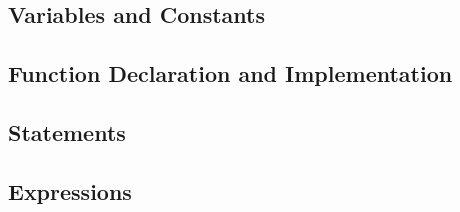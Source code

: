 \subsection{Variables and Constants}

\subsection{Function Declaration and Implementation}

\subsection{Statements}

\subsection{Expressions}
